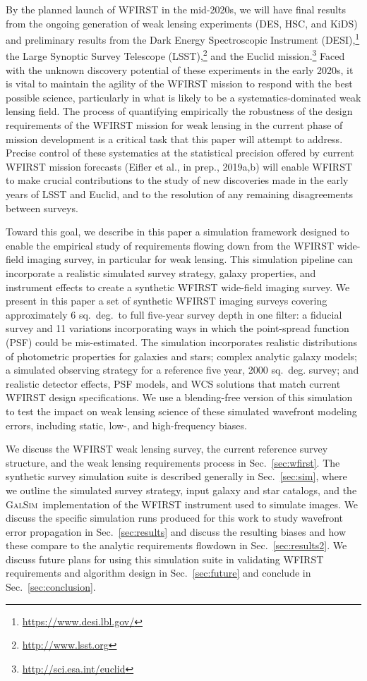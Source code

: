 \documentclass[usenatbib]{mnras}
\newcommand{\galsim}{\textsc{GalSim}}
\begin{document}
By the planned launch of WFIRST in the mid-2020s, we will have final results from the ongoing generation of weak lensing experiments (DES, HSC, and KiDS) and preliminary results from the Dark Energy Spectroscopic Instrument (DESI),\footnote{\url{https://www.desi.lbl.gov/}} the Large Synoptic Survey Telescope (LSST),\footnote{\url{http://www.lsst.org}} and the Euclid mission.\footnote{\url{http://sci.esa.int/euclid}} 
Faced with the unknown discovery potential of these experiments in the early 2020s, it is vital to maintain the agility of the WFIRST mission to respond with the best possible science, particularly in what is likely to be a systematics-dominated weak lensing field.
The process of quantifying empirically the robustness of the design requirements of the WFIRST mission for weak lensing in the current phase of mission development is a critical task that this paper will attempt to address. 
Precise control of these systematics at the statistical precision offered by current WFIRST mission forecasts (Eifler et al., in prep., 2019a,b) will enable WFIRST to make crucial contributions to the study of new discoveries made in the early years of LSST and Euclid, and to the resolution of any remaining disagreements between surveys.

Toward this goal, we describe in this paper a simulation framework designed to enable the empirical study of requirements flowing down from the WFIRST wide-field imaging survey, in particular for weak lensing. 
This simulation pipeline can incorporate a realistic simulated survey strategy, galaxy properties, and instrument effects to create a synthetic WFIRST wide-field imaging survey. 
We present in this paper a set of synthetic WFIRST imaging surveys covering approximately 6 sq.~deg.~to full five-year survey depth in one filter: a fiducial survey and 11 variations incorporating ways in which the point-spread function (PSF) could be mis-estimated. 
The simulation incorporates realistic distributions of photometric properties for galaxies and stars; complex analytic galaxy models; a simulated observing strategy for a reference five year, 2000 sq.~deg. survey; and realistic detector effects, PSF models, and WCS solutions that match current WFIRST design specifications. 
We use a blending-free version of this simulation to test the impact on weak lensing science of these simulated wavefront modeling errors, including static, low-, and high-frequency biases. 

We discuss the WFIRST weak lensing survey, the current reference survey structure, and the weak lensing requirements process in Sec.~\ref{sec:wfirst}. The  synthetic survey simulation suite is described generally in Sec.~\ref{sec:sim}, where we outline the simulated survey strategy, input galaxy and star catalogs, and the \galsim\ implementation of the WFIRST instrument used to simulate images. We discuss the specific simulation runs produced for this work to study wavefront error propagation in Sec.~\ref{sec:results} and discuss the resulting biases and how these compare to the analytic requirements flowdown in Sec.~\ref{sec:results2}. We discuss future plans for using this simulation suite in validating WFIRST requirements and algorithm design in Sec.~\ref{sec:future} and conclude in Sec.~\ref{sec:conclusion}. 
\end{document}
